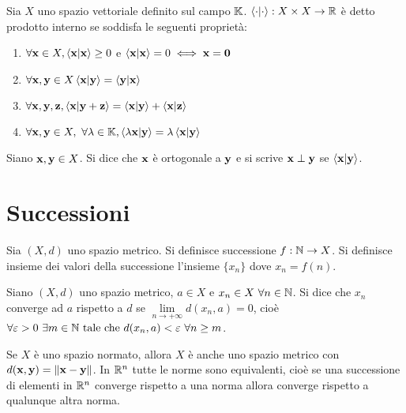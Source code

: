 \begin{definition}
    Sia $X$ uno spazio vettoriale definito sul campo $\mathbb{K}$. $\innerproduct{\cdot}{\cdot}: X \times X \to \R$ è detto prodotto interno se soddisfa le seguenti proprietà:
    \begin{enumerate}
        \item $\forall \vb{x} \in X, \innerproduct{\vb{x}} \geq 0$ e $\innerproduct{\vb{x}} = 0 \iff \vb{x} = \vb{0}$
        \item $\forall \vb{x}, \vb{y} \in X \innerproduct{\vb{x}}{\vb{y}}=\innerproduct{\vb{y}}{\vb{x}}$
        \item $\forall \vb{x}, \vb{y}, \vb{z}, \innerproduct{\vb{x}}{\vb{y}+\vb{z}}=\innerproduct{\vb{x}}{\vb{y}} + \innerproduct{\vb{x}}{\vb{z}}$
        \item $\forall \vb{x}, \vb{y} \in X, \ \forall \lambda \in \K, \innerproduct{\lambda \vb{x}}{\vb{y}} = \lambda \innerproduct{\vb{x}}{\vb{y}} $
    \end{enumerate}
\end{definition}

\begin{definition}
    [Ortogonale]
    Siano $\vb{x}, \vb{y} \in X$. Si dice che $\vb{x}$ è ortogonale a $\vb{y}$ e si scrive $\vb{x} \perp \vb{y}$ se $\innerproduct{\vb{x}}{\vb{y}}$.
\end{definition}

\section{Successioni}

\begin{definition}
    Sia $(X, d)$ uno spazio metrico. Si definisce successione $f: \mathbb{N} \to X$. Si definisce insieme dei valori della successione l'insieme $\{x_n\}$ dove $x_n = f(n)$.
\end{definition}

\begin{definition}
    Siano $(X, d)$ uno spazio metrico, $a \in X$ e $x_n \in X \ \forall n \in \mathbb{N}$. Si dice che $x_n$ converge ad $a$ rispetto a $d$ se $\lim\limits_{n \to + \infty}d(x_n, a) = 0$, cioè $\forall \varepsilon > 0 \ \exists m \in \mathbb{N} \text{ tale che } d(x_n, a) < \varepsilon \ \forall n \geq m$.
\end{definition}

\begin{remark}
    Se $X$ è uno spazio normato, allora $X$ è anche uno spazio metrico con $d(\vb{x},\vb{y}) = \norm{\vb{x}-\vb{y}}$. In $\mathbb{R}^n$ tutte le norme sono equivalenti, cioè se una successione di elementi in $\mathbb{R}^n$ converge rispetto a una norma allora converge rispetto a qualunque altra norma.
\end{remark}

